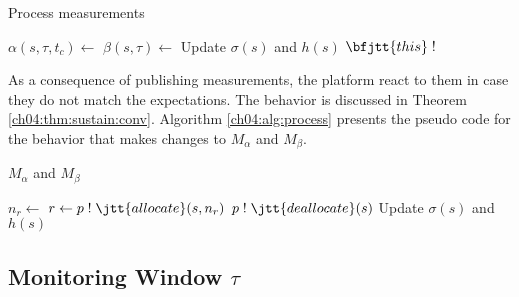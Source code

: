 % 
\begin{algorithm}
\caption{Process measurements}
\label{ch04:alg:publish}
\begin{algorithmic}
  \State $\alpha(s,\tau,t_c) \gets$ 
  \State $\beta(s,\tau) \gets$ 
  \State Update $\sigma(s)$ and $h(s)$
  \State $\bfjtt{this} \; ! \;$ 
\EndFunction
\end{algorithmic}
\end{algorithm}
% 


As a consequence of publishing measurements, the platform react to them in case they do not match the expectations.
The behavior is discussed in Theorem \ref{ch04:thm:sustain:conv}.
Algorithm \ref{ch04:alg:process} presents the pseudo code for the behavior that makes changes to $M_\alpha$ and $M_\beta$.

% 
\begin{algorithm}
\caption{$M_\alpha$ and $M_\beta$}
\label{ch04:alg:process}
\begin{algorithmic}
    \State $n_r \gets$ 
    \State $r \gets p \; ! \; \jtt{allocate}(s, n_r)$
  \EndIf
    \State $p \; ! \; \jtt{deallocate}(s)$
  \EndIf
  \State Update $\sigma(s)$ and $h(s)$
\EndFunction
\end{algorithmic}
\end{algorithm}


\subsection{Monitoring Window $\tau$}

